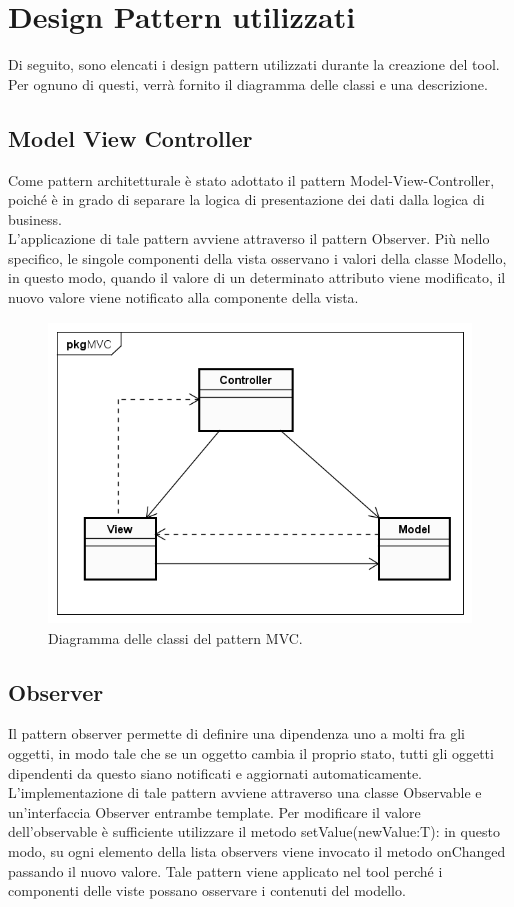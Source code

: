 
\section{Design Pattern utilizzati}\label{sec:design-pattern-utilizzati}
Di seguito, sono elencati i design pattern utilizzati durante la creazione del tool. Per ognuno di questi, verrà fornito il diagramma delle classi e una descrizione.
\subsection{Model View Controller}\label{subsec:model-view-controller}
Come pattern architetturale è stato adottato il pattern Model-View-Controller, poiché è in grado di separare la logica di presentazione dei dati dalla logica di business.\\
L'applicazione di tale pattern avviene attraverso il pattern Observer.
Più nello specifico, le singole componenti della vista osservano i valori della classe Modello, in questo modo, quando il valore di un determinato attributo viene modificato, il nuovo valore viene notificato alla componente della vista.

\begin{figure}[H]
    \centering
    \includegraphics[width=13cm, height=8cm]{./immagini/diagrammi_uml/mvc.png}
    \caption{Diagramma delle classi del pattern MVC.}\label{fig:mvc}
\end{figure}

\newpage
\subsection{Observer}\label{subsec:observer}
Il pattern observer\cite{womak:observer} permette di definire una dipendenza uno a molti fra gli
oggetti, in modo tale che se un oggetto cambia il proprio stato, tutti gli oggetti
dipendenti da questo siano notificati e aggiornati automaticamente.
L'implementazione di tale pattern avviene attraverso una classe Observable e un'interfaccia Observer entrambe template.
Per modificare il valore dell'observable è sufficiente utilizzare il metodo setValue(newValue:T): in questo modo, su ogni elemento della lista observers viene invocato il metodo onChanged passando il nuovo valore.
Tale pattern viene applicato nel tool perché i componenti delle viste possano osservare i contenuti del modello.

